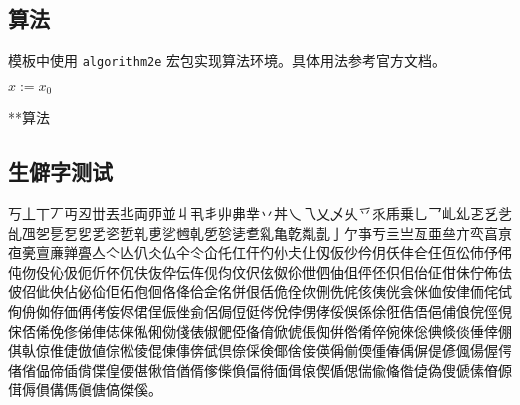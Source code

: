 \subsection{算法}
模板中使用 \texttt{algorithm2e} 宏包实现算法环境。具体用法参考官方文档。

\begin{algorithm}
  \SetAlgoLined
  $x:=x_{0}$\;
  \caption{**算法}
  \label{algo:algorithm1}
\end{algorithm}

\nocite{*}

\subsection{生僻字测试}
丂丄丅丆丏丒丗丟丠両丣並丩丮丯丱丳丵丷丼乀乁乂乄乆乊乑乕乗乚乛乢乣乤乥乧乨乪乫乬乭乮乯乲乴乵乶乷乸乹乺乻乼乽乿亀亁亃亄亅亇亊亐亖亗亙亜亝亣亪亯亰亱亴亶亷亸亹亼亽亾仈仌仏仐仒仚仛仜仠仢仦仧仩仭仮仯仱仴仸仹仺仼仾伀伂伃伄伅伆伇伈伋伌伒伓伔伕伖伜伝伡伣伨伩伬伭伮伱伳伵伷伹伻伾伿佀佁佂佄佅佇佈佉佊佋佌佒佔佖佡佢佦佨佪佫佭佮佱佲併佷佸佹佺佽侀侁侂侅侇侊侌侎侐侒侓侕侘侙侚侜侞侟価侢侤侫侭侰侱侲侳侴侶侷侸侹侺侻侼侽侾俀俁係俆俇俈俉俋俌俍俒俓俔俕俖俙俛俢俤俥俧俫俬俰俲俴俵俶俷俹俻俼俽俿倀倁倂倃倄倅倇倈倊倎倐倓倕倖倗倛倝倞倠倢倣値倧倯倰倱倲倳倴倵倶倷倸倹倻倽倿偀偁偂偄偅偆偊偋偍偐偑偒偓偔偖偗偘偙偛偝偞偟偠偡偢偣偤偦偧偨偩偪偫偭偮偯偰偱偲偳偸偹偺偼偽傁傂傃傄傆傇傉傊傋傌傎傏傐傑傒。

